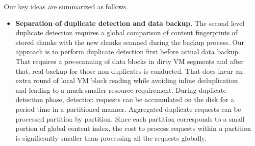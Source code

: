 Our key ideas are summarized as follows.
\begin{itemize}


\item {\bf Separation of duplicate detection and data backup.}
The second level duplicate detection requires a global comparison of 
content fingerprints of stored chunks with the new chunks scanned during 
the backup process. 
Our approach is to perform duplicate detection first before actual data backup.
That requires a pre-scanning of  data  blocks in dirty VM segments  and after that, real backup  for those non-duplicates
is conducted. That does incur an extra  round of local VM block reading while avoiding inline 
deduplication and leading to a much smaller resource requirement.  
During duplicate detection phase, detection requests can be accumulated on the disk 
for a period time  in a  partitioned manner.  Aggregated duplicate requests can be processed partition by partition. 
Since each partition corresponds to a small portion of global content index, the cost to 
process requests within a partition is significantly smaller than processing all the requests globally.


\end{itemize}
